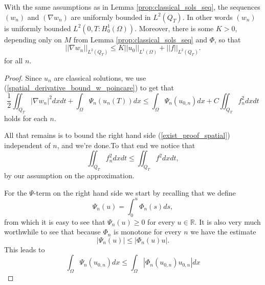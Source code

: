 \documentclass[11pt, a4paper]{article}
\begin{document}
\begin{lemma}
\label{prop:spatial_boundedness}
With the same assumptions as in Lemma \ref{prop:classical_sols_seq},
the sequences $(w_n)$ and $(\nabla w_n)$ are uniformly bounded in $L^2(Q_T)$. In other words $(w_n)$ is uniformly bounded $L^2(0,T: H^1_0(\Omega))$. Moreover, there is some $K >0$, depending only on $M$ from Lemma \ref{prop:classical_sols_seq} and $\Phi$, so that
\begin{equation}
\label{gradwn_bound_uniform}
||\nabla w_n||_{L^2(Q_T)} \leq K||u_0||_{L^1(\Omega)} + ||f||_{L^2(Q_T)}.
\end{equation}
for all $n$.
\end{lemma}
\begin{proof}
Since $u_n$ are classical solutions, we use (\ref{spatial_derivative_bound_w_poincare}) to get that
	\begin{equation}
	\label{exist_proof_spatial}
	\frac{1}{2}\iint_{Q_T}|\nabla w_n|^2 dxdt + \int_\Omega \Psi_n(u_n(T))dx  \leq \int_\Omega \Psi_n(u_{0,n})dx + C\iint_{Q_T}f_n^2 dxdt
	\end{equation}
	holds for each $n$.


	All that remains is to bound the right hand side (\ref{exist_proof_spatial}) independent of $n$, and we're done.To that end we notice that
	\begin{equation*}
	\iint_{Q_T}f_n^2dxdt \leq \iint_{Q_T} f^2 dxdt,
	\end{equation*}
	by our assumption on the approximation.
	
	For the $\Psi$-term on the right hand side we start by recalling that we define
	\begin{equation*}
	\Psi_n(u) = \int_0^{u}\Phi_n(s)ds,
	\end{equation*}
	from which it is easy to see that $\Psi_n(u) \geq 0$ for every $u \in \mathbb{R}$. It is also very much worthwhile to see that because $\Phi_n$ is monotone for every $n$ we have the estimate
	\begin{equation*}
	|\Psi_n(u)| \leq |\Phi_n(u)u|.
	\end{equation*}
	This leads to
	\begin{equation*}
	\int_\Omega \Psi_n(u_{0,n})dx \leq \int_\Omega |\Phi_n(u_{0,n})u_{0,n}|dx	
	\end{equation*}


\end{proof}
\end{document}
